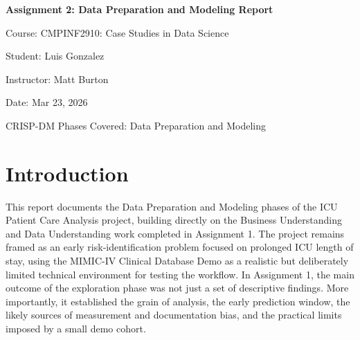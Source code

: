 \documentclass[12pt]{article}
\newcommand{\ProjectTitle}{Assignment 2: Data Preparation and Modeling Report}
\newcommand{\CourseName}{CMPINF2910: Case Studies in Data Science}
\newcommand{\StudentName}{Luis Gonzalez}
\newcommand{\InstructorName}{Matt Burton}
\newcommand{\DueDate}{Mar 23, 2026}
\begin{document}
\begin{titlepage}
    \centering
    {\Large \textbf{\ProjectTitle}\par}
    \vspace{1.0cm}
    {\large Course: \CourseName\par}
    \vspace{0.3cm}
    {\large Student: \StudentName\par}
    \vspace{0.3cm}
    {\large Instructor: \InstructorName\par}
    \vspace{0.3cm}
    {\large Date: \DueDate\par}
    \vfill
    {\small CRISP-DM Phases Covered: Data Preparation and Modeling}
\end{titlepage}

\tableofcontents
\newpage

\section*{Introduction}
\label{sec:intro}

%
%
%

This report documents the Data Preparation and Modeling phases of the ICU Patient Care Analysis project, building directly on the Business Understanding and Data Understanding work completed in Assignment 1. The project remains framed as an early risk-identification problem focused on prolonged ICU length of stay, using the MIMIC-IV Clinical Database Demo as a realistic but deliberately limited technical environment for testing the workflow. In Assignment 1, the main outcome of the exploration phase was not just a set of descriptive findings. More importantly, it established the grain of analysis, the early prediction window, the likely sources of measurement and documentation bias, and the practical limits imposed by a small demo cohort.
\end{document}
